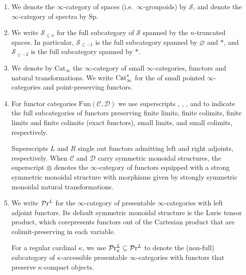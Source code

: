 \documentclass[10pt,a4paper,oneside]{article}
\begin{document}
\begin{enumerate}[label=(\alph*)]
\item We denote the \(\infty\)-category of spaces (i.e.\ \(\infty\)-groupoids) by \(\mathcal{S}\), and denote the \(\infty\)-category of spectra by \(\mathrm{Sp}\).

\item We write \(\mathcal{S}_{\leq n}\) for the full subcategory of \(\mathcal{S}\) spanned by the \(n\)-truncated spaces. In particular, \(\mathcal{S}_{\leq -1}\) is the full subcategory spanned by \(\varnothing\) and \(*\), and \(\mathcal{S}_{\leq -2}\) is the full subcategory spanned by \(*\).

\item We denote by \(\mathrm{Cat}_{\infty}\) the \(\infty\)-category of small $\infty$-categories, functors and natural transformations. We write $\operatorname{Cat}_{\infty}^*$ for the \infcat  of small pointed $\infty$-categories and point-preserving functors.

\item For functor categories \(\mathrm{Fun}(\mathcal{C},\mathcal{D})\) we use superscripts , , ,  and  to indicate the full subcategories of functors preserving finite limits, finite colimits, finite limits and finite colimits (exact functors), small limits, and small colimits, respectively.

Superscripts \(L\) and \(R\) single out functors admitting left and right adjoints, respectively. When \(\mathcal{C}\) and \(\mathcal{D}\) carry symmetric monoidal structures, the superscript \(\otimes\) denotes the \(\infty\)-category of functors equipped with a strong symmetric monoidal structure with morphisms given by strongly symmetric monoidal natural transformations.

\item We write \(\mathcal{P}\mathrm{r}^L\) for the \(\infty\)-category of presentable \(\infty\)-categories with left adjoint functors. Its default symmetric monoidal structure is the Lurie tensor product, which corepresents functors out of the Cartesian product that are colimit-preserving in each variable. 

For a regular cardinal \(\kappa\), we use \(\mathcal{P}\mathrm{r}^L_{\kappa}\subseteq\mathcal{P}\mathrm{r}^L\) to denote the (non-full) subcategory of \(\kappa\)-accessible presentable \(\infty\)-categories with functors that preserve \(\kappa\)-compact objects.


\end{enumerate}
\end{document}
